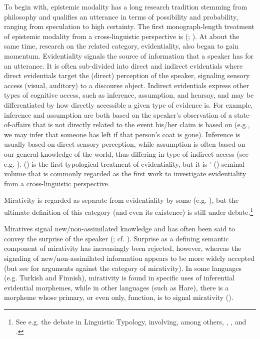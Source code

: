 \documentclass[output=paper]{langsci/langscibook}
\begin{document}
To begin with, epistemic modality has a long research tradition stemming from philosophy and qualifies an utterance in terms of possibility and probability, ranging from speculation to high certainty. The first monograph-length treatment of epistemic modality from a cross-linguistic perspective is \citeauthor{Palmer1986} (\citeyear{Palmer1986}; \citeyear{Palmer2001}). At about the same time, research on the related category, evidentiality, also began to gain momentum. Evidentiality signals the source of information that a speaker has for an utterance. It is often sub-divided into direct and indirect evidentials where direct evidentials target the (direct) perception of the speaker, signaling sensory access (visual, auditory) to a discourse object. Indirect evidentials express other types of cognitive access, such as inference, assumption, and hearsay, and may be differentiated by how directly accessible a given type of evidence is. For example, inference and assumption are both based on the speaker’s observation of a state-of-affairs that is not directly related to the event his/her claim is based on (e.g., we may infer that someone has left if that person’s coat is gone). Inference is usually based on direct sensory perception, while assumption is often based on our general knowledge of the world, thus differing in type of indirect access (see e.g. \citealt{Willett1988}). \citeauthor{Aikhenvald2004} (\citeyear{Aikhenvald2004}) is the first typological treatment of evidentiality, but it is \citeauthor{ChafeNichols1986}’ (\citeyear{ChafeNichols1986}) seminal volume that is commonly regarded as the first work to investigate evidentiality from a cross-linguistic perspective.

Mirativity is regarded as separate from evidentiality by some (e.g. \citealt{DeLancey1997}), but the ultimate definition of this category (and even its existence) is still under debate.\footnote{See e.g. the debate in Linguistic Typology, involving, among others, \cite{Hill2012}, \cite{DeLancey2012}, and \cite{HengeveldOlbertz2012}.}

Miratives signal new/non-assimilated knowledge and has often been said to convey the surprise of the speaker (\citealt{DeLancey1997}; cf. \citealt{Aikhenvald2014}). Surprise as a defining semantic component of mirativity has increasingly been rejected, however, whereas the signaling of new/non-assimilated information appears to be more widely accepted (but see \citealt{Hill2012} for arguments against the category of mirativity). In some languages (e.g. Turkish and Finnish), mirativity is found in specific uses of inferential evidential morphemes, while in other languages (such as Hare), there is a morpheme whose primary, or even only, function, is to signal mirativity (\citealt{DeLancey1997}).
\end{document}
